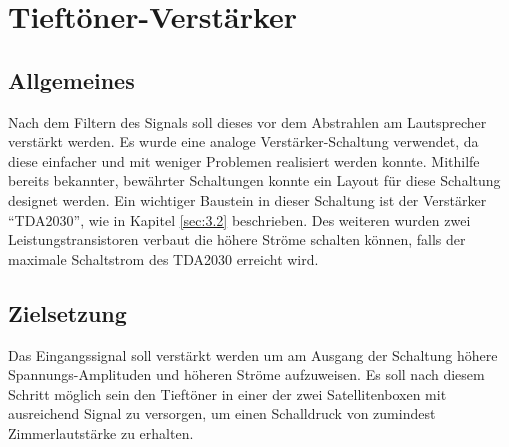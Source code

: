 \null\newpage
\section{Tieftöner-Verstärker}\label{sec:5.3}
\subsection{Allgemeines}\label{subsec:5.3.1}
Nach dem Filtern des Signals soll dieses vor dem Abstrahlen am Lautsprecher verstärkt werden. Es wurde eine analoge Verstärker-Schaltung verwendet, da diese einfacher und mit weniger Problemen realisiert werden konnte. Mithilfe bereits bekannter, bewährter Schaltungen konnte ein Layout für diese Schaltung designet werden. Ein wichtiger Baustein in dieser Schaltung ist der Verstärker \enquote{TDA2030}, wie in Kapitel \ref{sec:3.2} beschrieben.  Des weiteren wurden zwei Leistungstransistoren verbaut die höhere Ströme schalten können, falls der maximale Schaltstrom des TDA2030 erreicht wird.

\subsection{Zielsetzung}\label{subsec:5.3.2}
Das Eingangssignal soll verstärkt werden um am Ausgang der Schaltung höhere Spannungs-Amplituden und höheren Ströme aufzuweisen. Es soll nach diesem Schritt möglich sein den Tieftöner in einer der zwei Satellitenboxen mit ausreichend Signal zu versorgen, um einen Schalldruck von zumindest Zimmerlautstärke zu erhalten. 

